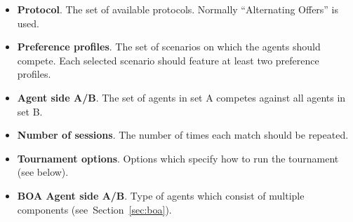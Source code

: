 \documentclass[]{article}
\begin{document}
\begin{itemize}
	\item \textbf{Protocol}. The set of available protocols. Normally ``Alternating Offers'' is used.
	\item \textbf{Preference profiles}. The set of scenarios on which the agents should compete. Each selected scenario should feature at least two preference profiles.
	\item \textbf{Agent side A/B}. The set of agents in set A competes against all agents in set B.
	\item \textbf{Number of sessions}. The number of times each match should be repeated.
	\item \textbf{Tournament options}. Options which specify how to run the tournament (see below).
	\item \textbf{BOA Agent side A/B}. Type of agents which consist of multiple components (see~Section~\ref{sec:boa}).
\end{itemize}
\end{document}
